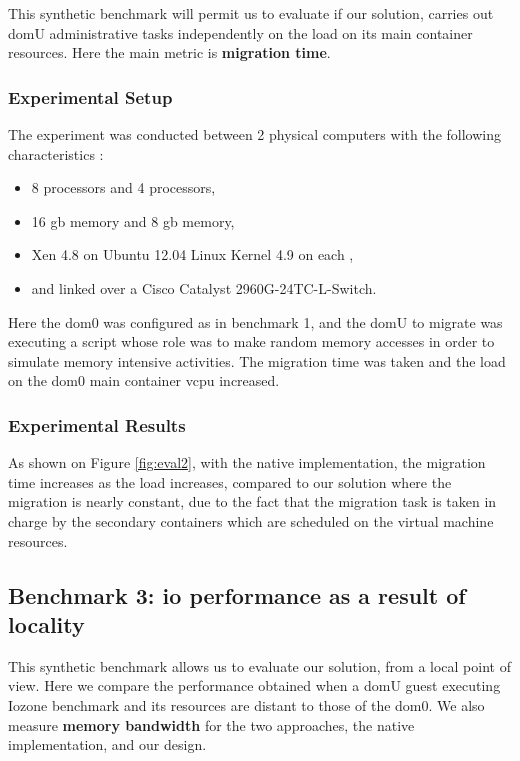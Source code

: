 This synthetic benchmark will permit us to evaluate if our solution, carries out domU administrative tasks independently on the load on its main container resources. Here the main metric is \textbf{migration time}. 

\subsubsection{Experimental Setup}

The experiment was conducted between 2 physical computers with the following characteristics : 

\begin{itemize}
    \item 8 processors and 4 processors,
    \item 16 \acrshort{gb} memory and 8 \acrshort{gb} memory,
    \item Xen 4.8 on Ubuntu 12.04 Linux Kernel 4.9 on each ,
    \item and linked over a Cisco Catalyst 2960G-24TC-L-Switch.
\end{itemize}

Here the dom0 was configured as in benchmark 1, and the domU to migrate was executing a script whose role was to make random memory accesses in order to simulate memory intensive activities. The migration time was taken and the load on the dom0 main container \acrshort{vcpu} increased.

\subsubsection{Experimental Results}

As shown on Figure \ref{fig:eval2}, with the native implementation, the migration time increases as the load increases, compared to our solution where the migration is nearly constant, due to the fact that the migration task is taken in charge by the secondary containers which are scheduled on the virtual machine resources.

\subsection{Benchmark 3: \acrshort{io} performance as a result of locality}
This synthetic benchmark allows us to evaluate our solution, from a local point of view. Here we  compare the performance obtained when a domU guest executing Iozone benchmark and its resources are distant to those of the dom0. We also measure \textbf{memory bandwidth} for the two approaches, the native implementation, and our design. 

